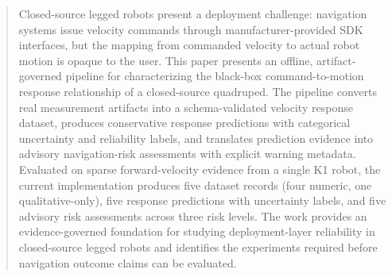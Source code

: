 ﻿%
\begin{abstract}
Closed-source legged robots present a deployment challenge: navigation systems issue velocity commands through manufacturer-provided SDK interfaces, but the mapping from commanded velocity to actual robot motion is opaque to the user. This paper presents an offline, artifact-governed pipeline for characterizing the black-box command-to-motion response relationship of a closed-source quadruped. The pipeline converts real measurement artifacts into a schema-validated velocity response dataset, produces conservative response predictions with categorical uncertainty and reliability labels, and translates prediction evidence into advisory navigation-risk assessments with explicit warning metadata. Evaluated on sparse forward-velocity evidence from a single K1 robot, the current implementation produces five dataset records (four numeric, one qualitative-only), five response predictions with uncertainty labels, and five advisory risk assessments across three risk levels. The work provides an evidence-governed foundation for studying deployment-layer reliability in closed-source legged robots and identifies the experiments required before navigation outcome claims can be evaluated.
\end{abstract}
